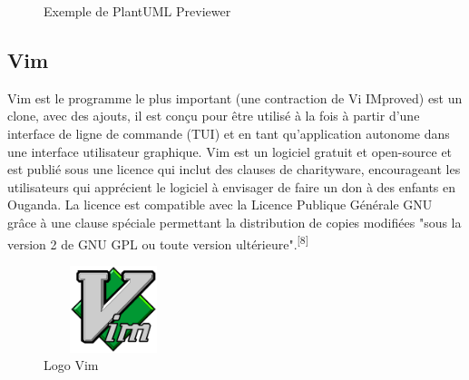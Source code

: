 \documentclass[12pt]{report}
\begin{document}
\vspace{0.15in}

\begin{figure}[h]
\centering
    \caption{Exemple de PlantUML Previewer}
\end{figure}

\vspace{-0.2in}

\subsection{Vim}
Vim est le programme le plus important (une contraction de Vi IMproved) est un clone, avec des ajouts, il est conçu pour être utilisé à la fois à partir d'une interface de ligne de commande (TUI) et en tant qu'application autonome dans une interface utilisateur graphique. Vim est un logiciel gratuit et open-source et est publié sous une licence qui inclut des clauses de charityware, encourageant les utilisateurs qui apprécient le logiciel à envisager de faire un don à des enfants en Ouganda. La licence est compatible avec la Licence Publique Générale GNU grâce à une clause spéciale permettant la distribution de copies modifiées "sous la version 2 de GNU GPL ou toute version ultérieure".\textsuperscript{[8]}

\vspace{0.25in}

\begin{figure}[h]
\centering
    \includegraphics[width = 1.6in, height = 1in]{../Images/Vim.png}
\caption{Logo Vim}
\end{figure}
\end{document}
